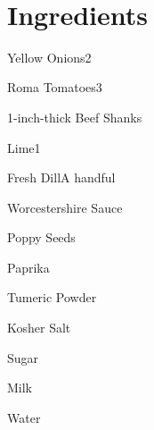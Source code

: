 \documentclass{recipe}
\begin{document}
\pagestyle{empty}
\\
\section{Ingredients}
\begin{cklist}
\begin{ingred}{Yellow Onions}{\num{2}}
\end{ingred}
\begin{ingred}{Roma Tomatoes}{\num{3}}
\end{ingred}
\begin{ingred}{1-inch-thick Beef Shanks}{}
\end{ingred}
\begin{ingred}{Lime}{\num{1}}
\end{ingred}
\begin{ingred}{Fresh Dill}{A handful}
\end{ingred}
\begin{ingred}{Worcestershire Sauce}{}
\end{ingred}
\begin{ingred}{Poppy Seeds}{}
\end{ingred}
\begin{ingred}{Paprika}{}
\end{ingred}
\begin{ingred}{Tumeric Powder}{}
\end{ingred}
\begin{ingred}{Kosher Salt}{}
\end{ingred}
\begin{ingred}{Sugar}{}
\end{ingred}
\begin{ingred}{Milk}{}
\end{ingred}
\begin{ingred}{Water}{}
\end{ingred}
\end{cklist}
\end{document}
